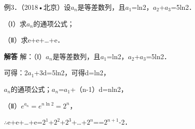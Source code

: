 例3．（2018•北京）设{\ensuremath{a_{n}}}是等差数列，且\ensuremath{a_{1}}=ln2，\ensuremath{a_{2}}+\ensuremath{a_{3}}=5ln2．\par
（Ⅰ）求{\ensuremath{a_{n}}}的通项公式；\par
（Ⅱ）求e+e+\ldots{}+e．\par
\QuestionSpace{4.8cm}
\ifshowanswers
\par\begingroup\color{solutioncolor}\noindent\textbf{解答}\quad
解：（Ⅰ）{\ensuremath{a_{n}}}是等差数列，且\ensuremath{a_{1}}=ln2，\ensuremath{a_{2}}+\ensuremath{a_{3}}=5ln2．\par
可得：2\ensuremath{a_{1}}+3d=5ln2，可得d=ln2，\par
{\ensuremath{a_{n}}}的通项公式；\ensuremath{a_{n}}=\ensuremath{a_{1}}+（n-1）d=nln2，\par
（Ⅱ）$e^{a_n}=e^{n\ln2}=2^n$，\par
\ensuremath{\therefore}e+e+\ldots{}+e=\ensuremath{2^{1}}+\ensuremath{2^{2}}+\ensuremath{2^{3}}+\ldots{}+\ensuremath{2^{n}}==\ensuremath{2^{n+1}}-2．\par
\par\endgroup\fi

